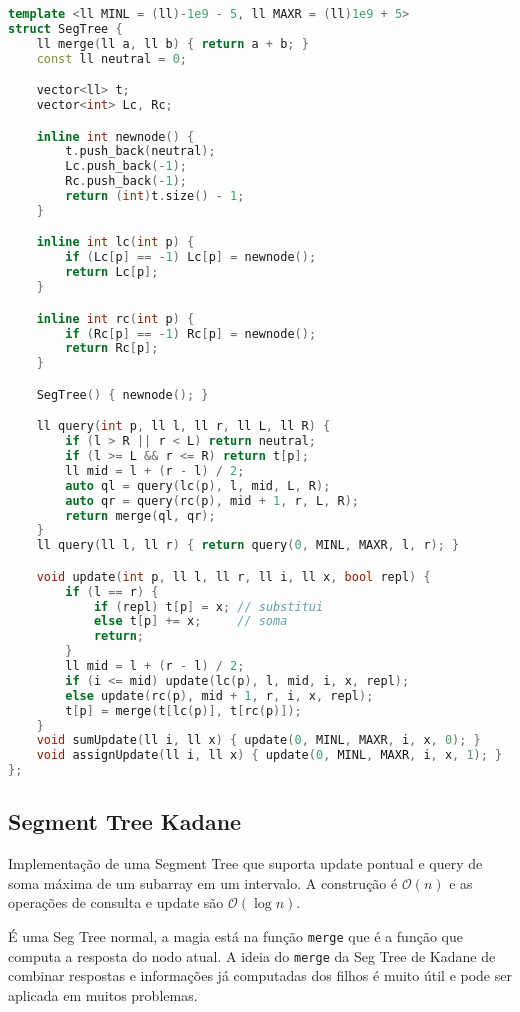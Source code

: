 \documentclass[10pt, a4paper, oneside]{book}
\begin{document}
\begin{lstlisting}[language=C++]
template <ll MINL = (ll)-1e9 - 5, ll MAXR = (ll)1e9 + 5>
struct SegTree {
    ll merge(ll a, ll b) { return a + b; }
    const ll neutral = 0;

    vector<ll> t;
    vector<int> Lc, Rc;

    inline int newnode() {
        t.push_back(neutral);
        Lc.push_back(-1);
        Rc.push_back(-1);
        return (int)t.size() - 1;
    }

    inline int lc(int p) {
        if (Lc[p] == -1) Lc[p] = newnode();
        return Lc[p];
    }

    inline int rc(int p) {
        if (Rc[p] == -1) Rc[p] = newnode();
        return Rc[p];
    }

    SegTree() { newnode(); }

    ll query(int p, ll l, ll r, ll L, ll R) {
        if (l > R || r < L) return neutral;
        if (l >= L && r <= R) return t[p];
        ll mid = l + (r - l) / 2;
        auto ql = query(lc(p), l, mid, L, R);
        auto qr = query(rc(p), mid + 1, r, L, R);
        return merge(ql, qr);
    }
    ll query(ll l, ll r) { return query(0, MINL, MAXR, l, r); }

    void update(int p, ll l, ll r, ll i, ll x, bool repl) {
        if (l == r) {
            if (repl) t[p] = x; // substitui
            else t[p] += x;     // soma
            return;
        }
        ll mid = l + (r - l) / 2;
        if (i <= mid) update(lc(p), l, mid, i, x, repl);
        else update(rc(p), mid + 1, r, i, x, repl);
        t[p] = merge(t[lc(p)], t[rc(p)]);
    }
    void sumUpdate(ll i, ll x) { update(0, MINL, MAXR, i, x, 0); }
    void assignUpdate(ll i, ll x) { update(0, MINL, MAXR, i, x, 1); }
};\end{lstlisting}
\hfill

\subsection{Segment Tree Kadane}


Implementação de uma Segment Tree que suporta update pontual e query de soma máxima de um subarray em um intervalo. A construção é $\mathcal{O}(n)$ e as operações de consulta e update são $\mathcal{O}(\log n)$.



É uma Seg Tree normal, a magia está na função \texttt{merge} que é a função que computa a resposta do nodo atual. A ideia do \texttt{merge} da Seg Tree de Kadane de combinar respostas e informações já computadas dos filhos é muito útil e pode ser aplicada em muitos problemas.
\end{document}
